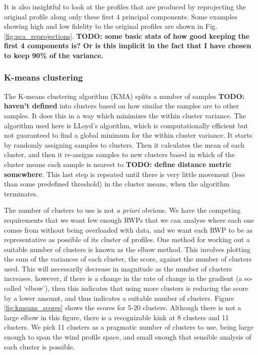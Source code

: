 \documentclass{article}
\newcommand\todo[1]{\textbf{TODO: #1}}
\begin{document}
It is also insightful to look at the profiles that are produced by reprojecting the original profile along only these first 4 principal components. Some examples showing high and low fidelity to the original profiles are shown in Fig. \ref{fig:pca_reprojections}. \todo{some basic stats of how good keeping the first 4 components is? Or is this implicit in the fact that I have chosen to keep 90\% of the variance.}

\subsubsection{K-means clustering}

The K-means clustering algorithm (KMA) splits a number of samples \todo{haven't defined} into clusters based on how similar the samples are to other samples. It does this in a way which minimizes the within cluster variance. The algorithm used here is LLoyd's algorithm, which is computationally efficient but not guaranteed to find a global minimum for the within cluster variance. It starts by randomly assigning samples to clusters. Then it calculates the mean of each cluster, and then it re-assigns samples to new clusters based in which of the cluster means each sample is nearest to \todo{define distance metric somewhere}. This last step is repeated until there is very little movement (less than some predefined threshold) in the cluster means, when the algorithm terminates.

The number of clusters to use is not \textit{a priori} obvious. We have the competing requirements that we want few enough RWPs that we can analyse where each one comes from without being overloaded with data, and we want each RWP to be as representative as possible of its cluster of profiles. One method for working out a suitable number of clusters is known as the elbow method. This involves plotting the sum of the variances of each cluster, the score, against the number of clusters used. This will necessarily decrease in magnitude as the number of clusters increases, however, if there is a change in the rate of change in the gradient (a so-called `elbow'), then this indicates that using more clusters is reducing the score by a lower amount, and thus indicates a suitable number of clusters. Figure \ref{fig:kmeans_scores} shows the scores for 5-20 clusters. Although there is not a large elbow in this figure, there is a recognizable kink at 8 clusters and 11 clusters. We pick 11 clusters as a pragmatic number of clusters to use, being large enough to span the wind profile space, and small enough that sensible analysis of each cluster is possible.
\end{document}
